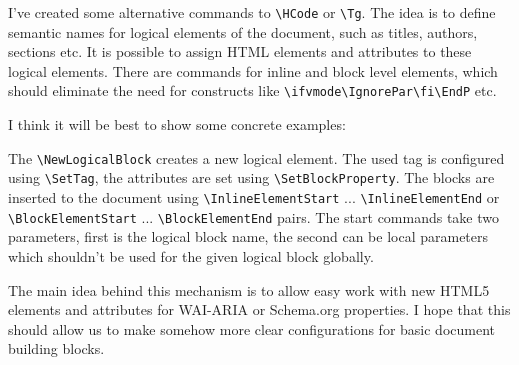 I've created some alternative commands to \verb|\HCode| or \verb|\Tg|. The idea is to define
semantic names for logical elements of the document, such as titles, authors,
sections etc. It is possible to assign HTML elements and attributes to these
logical elements. There are commands for inline and block level elements,
which should eliminate the need for constructs like \verb|\ifvmode\IgnorePar\fi\EndP|
etc.

I think it will be best to show some concrete examples:


\begin{texsource}



{\NoFonts{}}
{\EndNoFonts}

{}
{\NoFonts{}}
{\EndNoFonts}
\end{texsource}



The \verb|\NewLogicalBlock| creates a new logical element. The used tag is configured
using \verb|\SetTag|, the attributes are set using \verb|\SetBlockProperty|. The blocks are
inserted to the document using \verb|\InlineElementStart| ...  \verb|\InlineElementEnd| or
\verb|\BlockElementStart| ... \verb|\BlockElementEnd| pairs. The start commands take two
parameters, first is the logical block name, the second can be local
parameters which shouldn't be used for the given logical block globally.

The main idea behind this mechanism is to allow easy work with new HTML5
elements and attributes for WAI-ARIA or Schema.org properties. I hope that
this should allow us to make somehow more clear configurations for basic
document building blocks.
